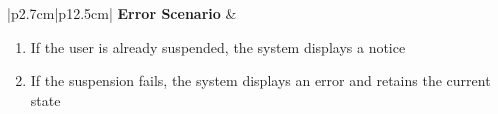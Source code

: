 \begin{table}[H]
\begin{tabular}{|p{2.7cm}|p{12.5cm}|}
        \hline
        \textbf{Error Scenario} & \begin{minipage}[t]{\linewidth}
                                      \begin{enumerate}[topsep=0pt,itemsep=1pt,parsep=0pt,partopsep=0pt]
                                          \item If the user is already suspended, the system displays a notice
                                          \item If the suspension fails, the system displays an error and retains the current
                                                state
                                      \end{enumerate}
                                  \end{minipage}        \\
        \hline
    \end{tabular}
    \label{tab:admin-suspend-user}
\end{table}
